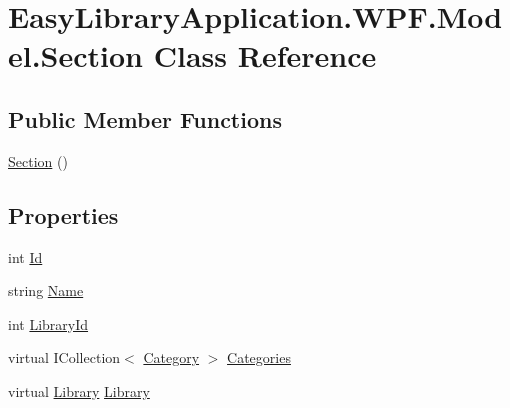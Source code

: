 \hypertarget{class_easy_library_application_1_1_w_p_f_1_1_model_1_1_section}{}\section{Easy\+Library\+Application.\+W\+P\+F.\+Model.\+Section Class Reference}
\label{class_easy_library_application_1_1_w_p_f_1_1_model_1_1_section}
\subsection*{Public Member Functions}
\begin{DoxyCompactItemize}
\item 
\mbox{\hyperlink{class_easy_library_application_1_1_w_p_f_1_1_model_1_1_section_ace4a5d55bf1998ee789128402e01f6b9}{Section}} ()
\end{DoxyCompactItemize}
\subsection*{Properties}
\begin{DoxyCompactItemize}
\item 
int \mbox{\hyperlink{class_easy_library_application_1_1_w_p_f_1_1_model_1_1_section_a4566fe8be14e823cacef7d94b3b272dc}{Id}}
\item 
string \mbox{\hyperlink{class_easy_library_application_1_1_w_p_f_1_1_model_1_1_section_a7178311bc74d5f4637aee8828831fae8}{Name}}
\item 
int \mbox{\hyperlink{class_easy_library_application_1_1_w_p_f_1_1_model_1_1_section_a86b37817dbadc054c63acb936aafe9fd}{Library\+Id}}
\item 
virtual I\+Collection$<$ \mbox{\hyperlink{class_easy_library_application_1_1_w_p_f_1_1_model_1_1_category}{Category}} $>$ \mbox{\hyperlink{class_easy_library_application_1_1_w_p_f_1_1_model_1_1_section_a6d30f089b4e84e67024902e41132eb06}{Categories}}
\item 
virtual \mbox{\hyperlink{class_easy_library_application_1_1_w_p_f_1_1_model_1_1_library}{Library}} \mbox{\hyperlink{class_easy_library_application_1_1_w_p_f_1_1_model_1_1_section_ab4a361d25697e818705f28fd4b6ec506}{Library}}
\end{DoxyCompactItemize}


